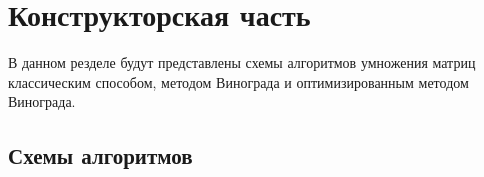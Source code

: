 \chapter{Конструкторская часть}

В данном резделе будут представлены схемы алгоритмов умножения матриц классическим способом,
методом Винограда и оптимизированным методом Винограда.

\section{Схемы алгоритмов}



\clearpage
